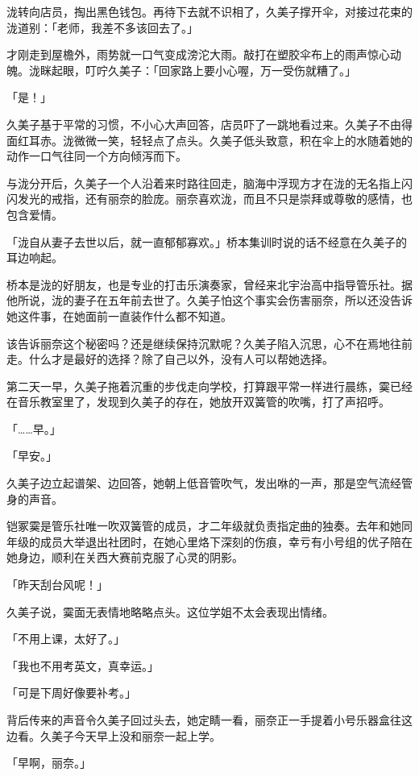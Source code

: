 \documentclass[UTF8]{ctexart}
\begin{document}
    泷转向店员，掏出黑色钱包。再待下去就不识相了，久美子撑开伞，对接过花束的泷道别：「老师，我差不多该回去了。」 

    才刚走到屋檐外，雨势就一口气变成滂沱大雨。敲打在塑胶伞布上的雨声惊心动魄。泷眯起眼，叮咛久美子：「回家路上要小心喔，万一受伤就糟了。」 

    「是！」 

    久美子基于平常的习惯，不小心大声回答，店员吓了一跳地看过来。久美子不由得面红耳赤。泷微微一笑，轻轻点了点头。久美子低头致意，积在伞上的水随着她的动作一口气往同一个方向倾泻而下。 

    与泷分开后，久美子一个人沿着来时路往回走，脑海中浮现方才在泷的无名指上闪闪发光的戒指，还有丽奈的脸庞。丽奈喜欢泷，而且不只是崇拜或尊敬的感情，也包含爱情。 

    「泷自从妻子去世以后，就一直郁郁寡欢。」桥本集训时说的话不经意在久美子的耳边响起。 

    桥本是泷的好朋友，也是专业的打击乐演奏家，曾经来北宇治高中指导管乐社。据他所说，泷的妻子在五年前去世了。久美子怕这个事实会伤害丽奈，所以还没告诉她这件事，在她面前一直装作什么都不知道。 

    该告诉丽奈这个秘密吗？还是继续保持沉默呢？久美子陷入沉思，心不在焉地往前走。什么才是最好的选择？除了自己以外，没有人可以帮她选择。 

    第二天一早，久美子拖着沉重的步伐走向学校，打算跟平常一样进行晨练，霙已经在音乐教室里了，发现到久美子的存在，她放开双簧管的吹嘴，打了声招呼。 

    「……早。」 

    「早安。」 

    久美子边立起谱架、边回答，她朝上低音管吹气，发出咻的一声，那是空气流经管身的声音。 

    铠冢霙是管乐社唯一吹双簧管的成员，才二年级就负责指定曲的独奏。去年和她同年级的成员大举退出社团时，在她心里烙下深刻的伤痕，幸亏有小号组的优子陪在她身边，顺利在关西大赛前克服了心灵的阴影。 

    「昨天刮台风呢！」 

    久美子说，霙面无表情地略略点头。这位学姐不太会表现出情绪。 

    「不用上课，太好了。」 

    「我也不用考英文，真幸运。」 

    「可是下周好像要补考。」 

    背后传来的声音令久美子回过头去，她定睛一看，丽奈正一手提着小号乐器盒往这边看。久美子今天早上没和丽奈一起上学。 

    「早啊，丽奈。」 
\end{document}
